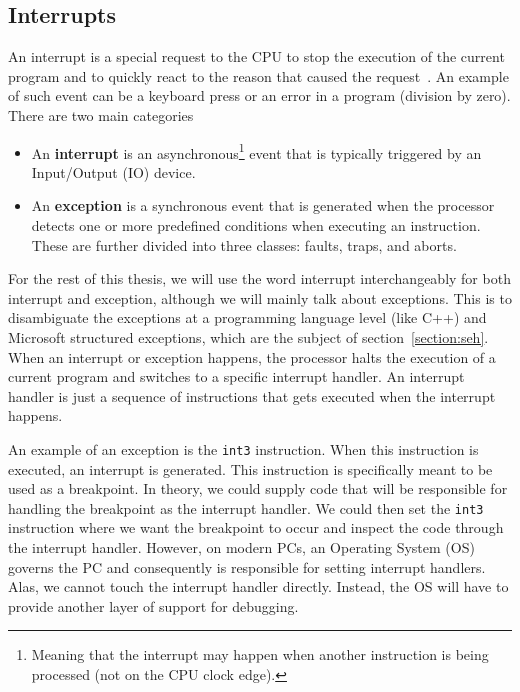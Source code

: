 \subsection{Interrupts}\label{section:interrupts}
An interrupt is a special request to the CPU to stop the execution of the
current program and to quickly react to the reason that caused the
request~\cite{computer-architecture}. An example of such event can be a
keyboard press or an error in a program (division by zero). There are two main
categories~\cite{intel-manual}
\begin{itemize}
    \item An \textbf{interrupt} is an asynchronous\footnote{Meaning that the
        interrupt may happen when another instruction is being processed (not
        on the CPU clock edge).} event that is typically triggered by an
        Input/Output (IO) device.
    \item An \textbf{exception} is a synchronous event that is
        generated when the processor detects one or more predefined conditions
        when executing an instruction. These are further divided into three
        classes: faults, traps, and aborts.
\end{itemize}


For the rest of this thesis, we will use the word interrupt interchangeably for
both interrupt and exception, although we will mainly talk about exceptions.
This is to disambiguate the exceptions at a programming language level (like
C++) and Microsoft structured exceptions, which are the subject of
section~\ref{section:seh}. When an interrupt or exception happens, the
processor halts the execution of a current program and switches to a specific
interrupt handler. An interrupt handler is just a sequence of instructions that
gets executed when the interrupt happens. 

An example of an exception is the \texttt{int3} instruction. When this
instruction is executed, an interrupt is generated. This instruction is
specifically meant to be used as a breakpoint. In theory, we could supply code
that will be responsible for handling the breakpoint as the interrupt handler.
We could then set the \texttt{int3} instruction where we want the breakpoint to
occur and inspect the code through the interrupt handler. However, on modern
PCs, an Operating System (OS) governs the PC and consequently is responsible
for setting interrupt handlers. Alas, we cannot touch the interrupt handler
directly. Instead, the OS will have to provide another layer of support for
debugging.

